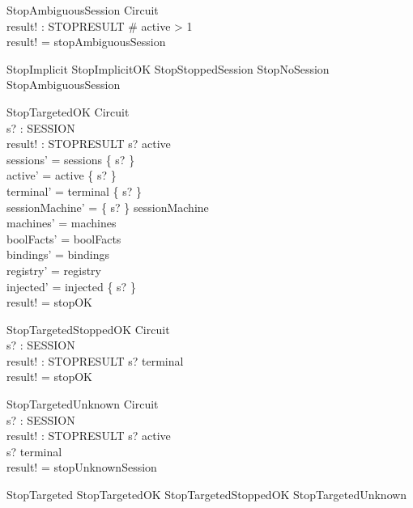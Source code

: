 \documentclass[a4paper,10pt,fleqn]{article}
\begin{document}
\begin{schema}{StopAmbiguousSession}
  \Xi Circuit \\
  result! : STOPRESULT
\where
  \# active > 1 \\
  result! = stopAmbiguousSession
\end{schema}

\begin{zed}
  StopImplicit  StopImplicitOK \lor StopStoppedSession \lor StopNoSession
    \lor StopAmbiguousSession
\end{zed}

\begin{schema}{StopTargetedOK}
  \Delta Circuit \\
  s? : SESSION \\
  result! : STOPRESULT
\where
  s? \in active \\
  sessions' = sessions \setminus \{ s? \} \\
  active' = active \setminus \{ s? \} \\
  terminal' = terminal \setminus \{ s? \} \\
  sessionMachine' = \{ s? \} \ndres sessionMachine \\
  machines' = machines \\
  boolFacts' = boolFacts \\
  bindings' = bindings \\
  registry' = registry \\
  injected' = injected \setminus \{ s? \} \\
  result! = stopOK
\end{schema}

\begin{schema}{StopTargetedStoppedOK}
  \Xi Circuit \\
  s? : SESSION \\
  result! : STOPRESULT
\where
  s? \in terminal \\
  result! = stopOK
\end{schema}

\begin{schema}{StopTargetedUnknown}
  \Xi Circuit \\
  s? : SESSION \\
  result! : STOPRESULT
\where
  s? \notin active \\
  s? \notin terminal \\
  result! = stopUnknownSession
\end{schema}

\begin{zed}
  StopTargeted  StopTargetedOK \lor StopTargetedStoppedOK
    \lor StopTargetedUnknown
\end{zed}
\end{document}
